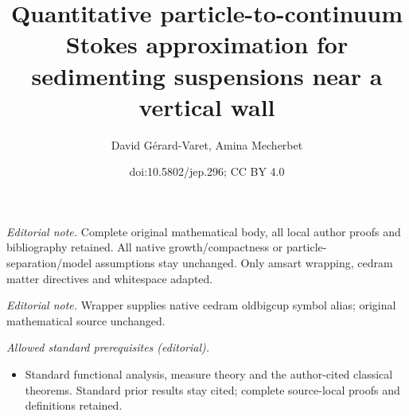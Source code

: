 \documentclass[10pt]{amsart}
\title{Quantitative particle-to-continuum Stokes approximation for sedimenting suspensions near a vertical wall}
\author{David Gérard-Varet, Amina Mecherbet}
\date{doi:10.5802/jep.296; CC BY 4.0}
\theoremstyle{plain}
\theoremstyle{definition}
\begin{document}
\maketitle
\noindent\textit{Editorial note.} Complete original mathematical body, all local author proofs and bibliography retained. All native growth/compactness or particle-separation/model assumptions stay unchanged. Only amsart wrapping, cedram matter directives and whitespace adapted.\par\medskip
\noindent\textit{Editorial note.} Wrapper supplies native cedram oldbigcup symbol alias; original mathematical source unchanged.\par\medskip
\noindent\textit{Allowed standard prerequisites (editorial).}\begin{itemize}
\item Standard functional analysis, measure theory and the author-cited classical theorems. Standard prior results stay cited; complete source-local proofs and definitions retained.
\end{itemize}\medskip

\tableofcontents
\end{document}

